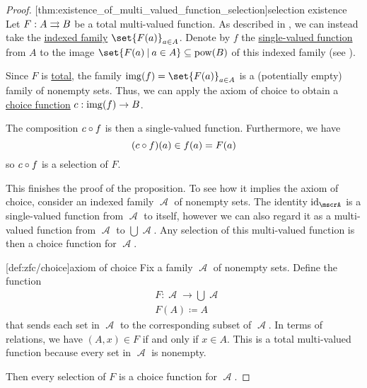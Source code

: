 \begin{proof}
  [thm:existence_of_multi_valued_function_selection]{selection existence} Let \( F: A \rightrightarrows B \) be a total multi-valued function. As described in , we can instead take the \hyperref[def:tuple_and_cartesian_product/indexed_family]{indexed family} \( \set{ F(a) }_{a \in A} \). Denote by \( f \) the \hyperref[def:function]{single-valued function} from \( A \) to the image \( \set{ F(a) \given a \in A } \subseteq \pow(B) \) of this indexed family (see ).

  Since \( F \) is \hyperref[def:multi_valued_function/total]{total}, the family \( \img(f) = \set{ F(a) }_{a \in A} \) is a (potentially empty) family of nonempty sets. Thus, we can apply the axiom of choice to obtain a \hyperref[def:choice_function]{choice function} \( c: \operatorname{img}(f) \to B \).

  The composition \( c \mathbin \circ f \) is then a single-valued function. Furthermore, we have
  \begin{equation*}
    (c \mathbin \circ f)(a) \in f(a) = F(a)
  \end{equation*}
  so \( c \mathbin \circ f \) is a selection of \( F \).

  This finishes the proof of the proposition. To see how it implies the axiom of choice, consider an indexed family \( \mscrA \) of nonempty sets. The identity \( \id_\mscrA \) is a single-valued function from \( \mscrA \) to itself, however we can also regard it as a multi-valued function from \( \mscrA \) to \( \bigcup \mscrA \). Any selection of this multi-valued function is then a choice function for \( \mscrA \).

  [def:zfc/choice]{axiom of choice} Fix a family \( \mscrA \) of nonempty sets. Define the function
  \begin{equation*}
    \begin{aligned}
      &F: \mscrA \to \bigcup \mscrA \\
      &F(A) \coloneqq A
    \end{aligned}
  \end{equation*}
  that sends each set in \( \mscrA \) to the corresponding subset of \( \mscrA \). In terms of relations, we have \( (A, x) \in F \) if and only if \( x \in A \). This is a total multi-valued function because every set in \( \mscrA \) is nonempty.

  Then every selection of \( F \) is a choice function for \( \mscrA \).
\end{proof}

